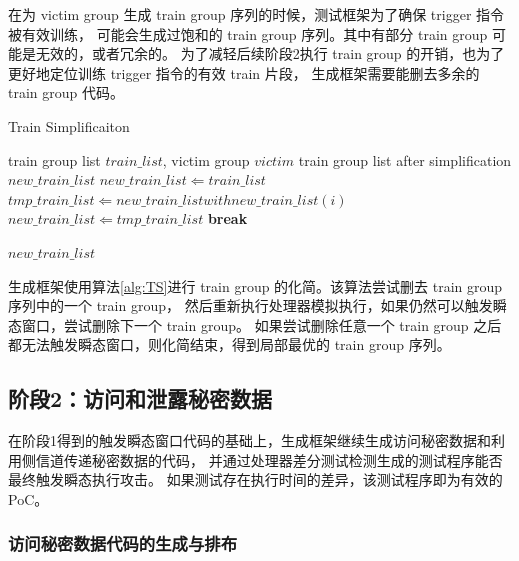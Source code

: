 在为 victim group 生成 train group 序列的时候，测试框架为了确保 trigger 指令被有效训练，
可能会生成过饱和的 train group 序列。其中有部分 train group 可能是无效的，或者冗余的。
为了减轻后续阶段2执行 train group 的开销，也为了更好地定位训练 trigger 指令的有效 train 片段，
生成框架需要能删去多余的 train group 代码。\par

\begin{algorithm}[!h]
    
    
    \caption{Train Simplificaiton}
    \label{alg:TS}
    \renewcommand{\algorithmicrequire}{\textbf{Input:}}
    \renewcommand{\algorithmicensure}{\textbf{Output:}}
    
    \begin{algorithmic}[1]
        \REQUIRE train group list $train\_list$, victim group $victim$  %
        \ENSURE train group list after simplification $new\_train\_list$    %
        \STATE $new\_train\_list \Leftarrow train\_list$
                \STATE $tmp\_train\_list \Leftarrow new\_train\_list with new\_train\_list(i)$
                    \STATE $new\_train\_list \Leftarrow tmp\_train\_list$
                    \STATE \textbf{break}
                \ENDIF
            \ENDFOR
        \ENDFOR

        \RETURN $new\_train\_list$
    \end{algorithmic}
\end{algorithm}

生成框架使用算法\ref{alg:TS}进行 train group 的化简。该算法尝试删去 train group 序列中的一个 train group，
然后重新执行处理器模拟执行，如果仍然可以触发瞬态窗口，尝试删除下一个 train group。
如果尝试删除任意一个 train group 之后都无法触发瞬态窗口，则化简结束，得到局部最优的 train group 序列。\par

\subsection{阶段2：访问和泄露秘密数据}

在阶段1得到的触发瞬态窗口代码的基础上，生成框架继续生成访问秘密数据和利用侧信道传递秘密数据的代码，
并通过处理器差分测试检测生成的测试程序能否最终触发瞬态执行攻击。
如果测试存在执行时间的差异，该测试程序即为有效的 PoC。

\subsubsection{访问秘密数据代码的生成与排布}

